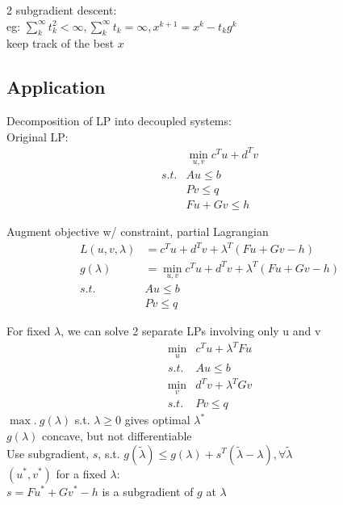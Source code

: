 \documentclass[8pt]{extarticle}
\begin{document}
\begin{multicols*}{2}
  subgradient descent:\\
  eg: $\sum_k^{\infty} t_k^2 < \infty, \sum_k^{\infty} t_k = \infty, x^{k+1} = x^k - t_k g^{k}$\\
  keep track of the best $x$
  
  \subsection{Application}
  Decomposition of LP into decoupled systems:\\
  
  Original LP:
  \begin{align*}
    &\min_{u,v} c^Tu + d^Tv\\
    s.t. & Au \leq b\\
    & Pv \leq q\\
    &Fu + Gv \leq h
  \end{align*}

  Augment objective w/ constraint, partial Lagrangian
  \begin{align*}
    L(u,v,\lambda) &= c^Tu+d^Tv + \lambda^T(Fu+Gv-h)\\
    g(\lambda) &= \min_{u,v} c^Tu+d^Tv + \lambda^T(Fu+Gv-h)\\
    s.t. & Au \leq b\\
         & Pv \leq q
  \end{align*}

  For fixed $\lambda$, we can solve 2 separate LPs involving only u and v
  \begin{align*}
    \min_{u} & c^Tu + \lambda^T Fu\\
    s.t. & Au \leq b
  \end{align*}
  \begin{align*}
    \min_{v} & d^Tv + \lambda^T Gv\\
    s.t. & Pv \leq q
  \end{align*}      
  $\max.\ g(\lambda)$ s.t. $\lambda \geq 0$ gives optimal $\lambda^*$\\
  
  $g(\lambda)$ concave, but not differentiable\\
  Use subgradient, $s$, s.t. $g(\tilde{\lambda}) \leq g(\lambda) + s^T(\tilde{\lambda} - \lambda), \forall \tilde{\lambda}$\\

  $(u^*,v^*)$ for a fixed $\lambda$:\\
  $s=Fu^*+Gv^*-h$ is a subgradient of $g$ at $\lambda$\\
  

\end{multicols*}
\end{document}
